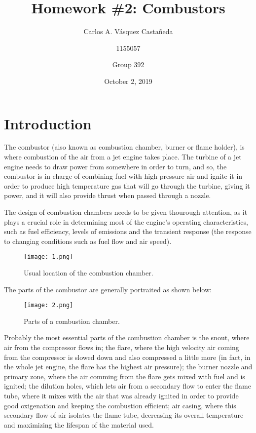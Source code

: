 \documentclass[12pt, letterpaper]{article}
\title{Homework \#2: Combustors}
\author{Carlos A. Vásquez Castañeda \and 1155057 \and Group 392}
\date{October 2, 2019}
\begin{document}
\maketitle
\section*{Introduction}
The combustor (also known as combustion chamber, burner or flame holder), is where combustion of the air from a jet engine takes place. The turbine of a jet engine needs to draw power from somewhere in order to turn, and so, the combustor is in charge of combining fuel with high pressure air and ignite it in order to produce high temperature gas that will go through the turbine, giving it power, and it will also provide thrust when passed through a nozzle. \autocite{nasacomb}

The design of combustion chambers needs to be given thourough attention, as it plays a crucial role in determining most of the engine's operating characteristics, such as fuel efficiency, levels of emissions and the transient response (the response to changing conditions such as fuel flow and air speed).

\begin{figure}[H]
	\centering
	\texttt{[image: 1.png]}
	\caption{Usual location of the combustion chamber.}
\end{figure}

The parts of the combustor are generally portraited as shown below:

\begin{figure}[H]
	\centering
	\texttt{[image: 2.png]}
	\caption{Parts of a combustion chamber.}
\end{figure}

Probably the most essential parts of the combustion chamber is the snout, where air from the compressor flows in; the flare, where the high velocity air coming from the compressor is slowed down and also compressed a little more (in fact, in the whole jet engine, the flare has the highest air pressure); the burner nozzle and primary zone, where the air comming from the flare gets mixed with fuel and is ignited; the dilution holes, which lets air from a secondary flow to enter the flame tube, where it mixes with the air that was already ignited in order to provide good oxigenation and keeping the combustion efficient; air casing, where this secondary flow of air isolates the flame tube, decreasing its overall temperature and maximizing the lifespan of the material used.\autocite{nag00}
\end{document}

